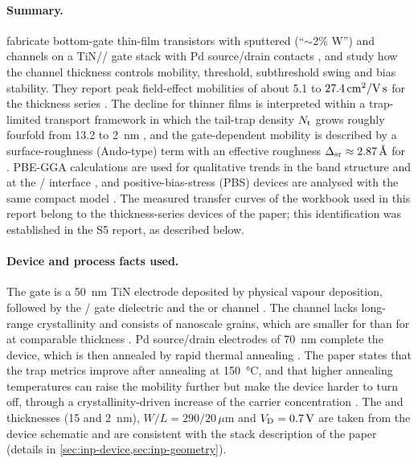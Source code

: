 \paragraph{Summary.}
\citet{Januar2026} fabricate bottom-gate thin-film transistors with sputtered \IWO{} (``$\sim$2\% W'')
and \InO{} channels on a TiN/\HfO/\AlO{} gate stack with Pd source/drain contacts
\citep[pp.~2--3]{Januar2026}, and study how the channel thickness controls mobility, threshold,
subthreshold swing and bias stability. They report peak field-effect mobilities of about 5.1 to
$27.4\,\mathrm{cm}^{2}/\mathrm{V\,s}$ for the \IWO{} thickness series \citep[p.~3]{Januar2026}. The decline for thinner films
is interpreted within a trap-limited transport framework in which the tail-trap density $N_{\mathrm{t}}$ grows
roughly fourfold from 13.2 to \SI{2}{nm} \citep[p.~7]{Januar2026}, and the gate-dependent mobility
is described by a surface-roughness (Ando-type) term with an effective roughness
$\Delta_{\mathrm{sr}} \approx \SI{2.87}{\angstrom}$ for \IWO{} \citep[pp.~7--8, Fig.~5f]{Januar2026}. PBE-GGA calculations
are used for qualitative trends in the band structure and at the \IWO/\HfO{} interface
\citep[p.~3]{Januar2026}, and positive-bias-stress (PBS) devices are analysed with the same compact
model \citep[p.~9]{Januar2026}. The measured transfer curves of the workbook used in this report
belong to the thickness-series devices of the paper; this identification was established in the S5
report, as described below.

\paragraph{Device and process facts used.}
The gate is a \SI{50}{nm} TiN electrode deposited by physical vapour deposition, followed by the
\HfO/\AlO{} gate dielectric and the \IWO{} or \InO{} channel \citep[p.~2]{Januar2026}. The channel
lacks long-range crystallinity and consists of nanoscale grains, which are smaller for \IWO{} than for
\InO{} at comparable thickness \citep[p.~2]{Januar2026}. Pd source/drain electrodes of \SI{70}{nm}
complete the device, which is then annealed by rapid thermal annealing \citep[p.~3]{Januar2026}. The
paper states that the trap metrics improve after annealing at \SI{150}{\degreeCelsius}, and that
higher annealing temperatures can raise the mobility further but make the device harder to turn off,
through a crystallinity-driven increase of the carrier concentration \citep[p.~3]{Januar2026}. The
\HfO{} and \AlO{} thicknesses (15 and \SI{2}{nm}), $W/L = 290/20$\,$\mu$m and $V_{\mathrm{D}} = \SI{0.7}{V}$ are
taken from the device schematic \citep{DeviceSchematic} and are consistent with the stack description
of the paper (details in \cref{sec:inp-device,sec:inp-geometry}).

